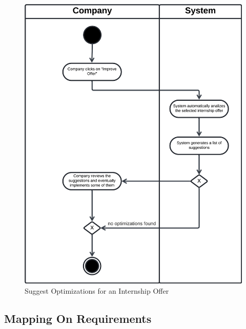\begin{figure}[H]
    \begin{center}
         \includegraphics[width=1\linewidth]{LaTeXCode/images/activity diagram/UC20.png}
         \caption{Suggest Optimizations for an Internship Offer}
         \label{fig:suggest_optimizations_internship_ad}
     \end{center}
\end{figure}

\newpage

\subsection{Mapping On Requirements}
\label{subsec:mapping_on_requirements}

\setcounter{row}{1}
\newcommand{\crow} {\therow\stepcounter{row}}


